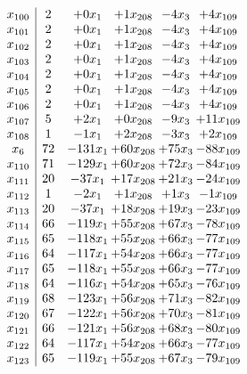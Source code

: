 \documentclass[11pt]{article}
\begin{document}
\[\begin{array}{c| c c@{\hskip 2pt} c@{\hskip 2pt} c@{\hskip 2pt} c@{\hskip 2pt} }
 x_{100}   &  2 & + 0 x_{1} & + 1 x_{208} & -4 x_{3} & + 4 x_{109}\\
 x_{101}   &  2 & + 0 x_{1} & + 1 x_{208} & -4 x_{3} & + 4 x_{109}\\
 x_{102}   &  2 & + 0 x_{1} & + 1 x_{208} & -4 x_{3} & + 4 x_{109}\\
 x_{103}   &  2 & + 0 x_{1} & + 1 x_{208} & -4 x_{3} & + 4 x_{109}\\
 x_{104}   &  2 & + 0 x_{1} & + 1 x_{208} & -4 x_{3} & + 4 x_{109}\\
 x_{105}   &  2 & + 0 x_{1} & + 1 x_{208} & -4 x_{3} & + 4 x_{109}\\
 x_{106}   &  2 & + 0 x_{1} & + 1 x_{208} & -4 x_{3} & + 4 x_{109}\\
 x_{107}   &  5 & + 2 x_{1} & + 0 x_{208} & -9 x_{3} & + 11 x_{109}\\
 x_{108}   &  1 & -1 x_{1} & + 2 x_{208} & -3 x_{3} & + 2 x_{109}\\
 x_{6}   &  72 & -131 x_{1} & + 60 x_{208} & + 75 x_{3} & -88 x_{109}\\
 x_{110}   &  71 & -129 x_{1} & + 60 x_{208} & + 72 x_{3} & -84 x_{109}\\
 x_{111}   &  20 & -37 x_{1} & + 17 x_{208} & + 21 x_{3} & -24 x_{109}\\
 x_{112}   &  1 & -2 x_{1} & + 1 x_{208} & + 1 x_{3} & -1 x_{109}\\
 x_{113}   &  20 & -37 x_{1} & + 18 x_{208} & + 19 x_{3} & -23 x_{109}\\
 x_{114}   &  66 & -119 x_{1} & + 55 x_{208} & + 67 x_{3} & -78 x_{109}\\
 x_{115}   &  65 & -118 x_{1} & + 55 x_{208} & + 66 x_{3} & -77 x_{109}\\
 x_{116}   &  64 & -117 x_{1} & + 54 x_{208} & + 66 x_{3} & -77 x_{109}\\
 x_{117}   &  65 & -118 x_{1} & + 55 x_{208} & + 66 x_{3} & -77 x_{109}\\
 x_{118}   &  64 & -116 x_{1} & + 54 x_{208} & + 65 x_{3} & -76 x_{109}\\
 x_{119}   &  68 & -123 x_{1} & + 56 x_{208} & + 71 x_{3} & -82 x_{109}\\
 x_{120}   &  67 & -122 x_{1} & + 56 x_{208} & + 70 x_{3} & -81 x_{109}\\
 x_{121}   &  66 & -121 x_{1} & + 56 x_{208} & + 68 x_{3} & -80 x_{109}\\
 x_{122}   &  64 & -117 x_{1} & + 54 x_{208} & + 66 x_{3} & -77 x_{109}\\
 x_{123}   &  65 & -119 x_{1} & + 55 x_{208} & + 67 x_{3} & -79 x_{109}\\

\end{array}\]
\end{document}
